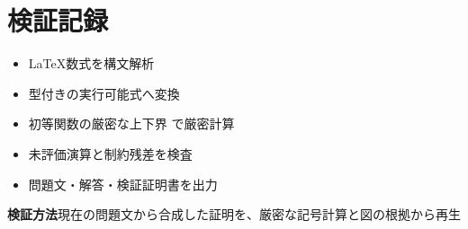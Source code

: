 \documentclass[uplatex,dvipdfmx,11pt]{jsarticle}
\begin{document}
\section*{検証記録}
\begin{itemize}
\item LaTeX数式を構文解析
\item 型付きの実行可能式へ変換
\item 初等関数の厳密な上下界 で厳密計算
\item 未評価演算と制約残差を検査
\item 問題文・解答・検証証明書を出力
\end{itemize}
\noindent\textbf{検証方法}\quad 現在の問題文から合成した証明を、厳密な記号計算と図の根拠から再生
\par{}
\end{document}
